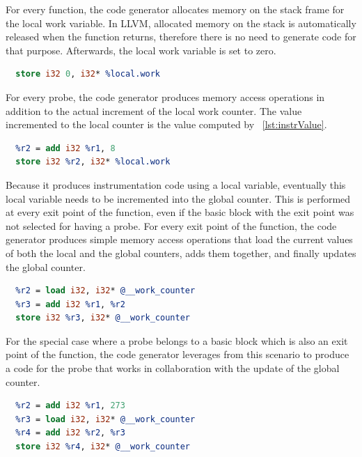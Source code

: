 For every function, the code generator allocates memory on the stack frame for the local work variable.
In LLVM, allocated memory on the stack is automatically released when the function returns, therefore there is no need to generate code for that purpose.
Afterwards, the local work variable is set to zero.

\begin{lstlisting}[language=llvm,style=nasm,caption={Code for the entry point of a function.}, label={lst:instr_entry_point}]
  %local.work = alloca i32
  store i32 0, i32* %local.work
\end{lstlisting}

For every probe, the code generator produces memory access operations in addition to the actual increment of the local work counter.
The value incremented to the local counter is the value computed by \lstlistingname~\ref{lst:instrValue}.

\begin{lstlisting}[language=llvm,style=nasm,caption={Code for a probe that increments the local work counter.}, label={lst:instr_probe}]
  %r1 = load i32, i32* %local.work
  %r2 = add i32 %r1, 8
  store i32 %r2, i32* %local.work
\end{lstlisting}

Because it produces instrumentation code using a local variable, eventually this local variable needs to be incremented into the global counter.
This is performed at every exit point of the function, even if the basic block with the exit point was not selected for having a probe.
For every exit point of the function, the code generator produces simple memory access operations that load the current values of both the local and the global counters, adds them together, and finally updates the global counter.

\begin{lstlisting}[language=llvm,style=nasm,caption={Code at an exit point of a function.}, label={lst:instr_exit_point}]
  %r1 = load i32, i32* %local.work
  %r2 = load i32, i32* @__work_counter
  %r3 = add i32 %r1, %r2
  store i32 %r3, i32* @__work_counter
\end{lstlisting}

For the special case where a probe belongs to a basic block which is also an exit point of the function, the code generator leverages from this scenario to produce a code for the probe that works in collaboration with the update of the global counter.

\begin{lstlisting}[language=llvm,style=nasm,caption={Code for a probe that increments the local work counter and also updates the global counter at an exit point of a function.}, label={lst:instr_probe_exit_point}]
  %r1 = load i32, i32* %local.work
  %r2 = add i32 %r1, 273
  %r3 = load i32, i32* @__work_counter
  %r4 = add i32 %r2, %r3
  store i32 %r4, i32* @__work_counter
\end{lstlisting}

